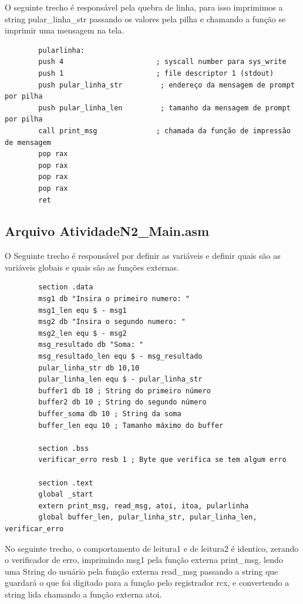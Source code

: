 \documentclass[12pt, openany, oneside, a4paper, brazil]{abntex2}
\begin{document}
	O seguinte trecho é responsável pela quebra de linha, para isso imprimimos a string pular\_linha\_str passando os valores pela pilha e chamando a função se imprimir uma mensagem na tela.
	
	\begin{verbatim}
		pularlinha:
		push 4                      ; syscall number para sys_write
		push 1                      ; file descriptor 1 (stdout)
		push pular_linha_str         ; endereço da mensagem de prompt por pilha
		push pular_linha_len         ; tamanho da mensagem de prompt por pilha
		call print_msg              ; chamada da função de impressão de mensagem
		pop rax
		pop rax
		pop rax
		pop rax
		ret
	\end{verbatim}
	
	\subsection*{Arquivo AtividadeN2\_Main.asm}
	
	O Seguinte trecho é responsável por definir as variáveis e definir quais são as variáveis globais e quais são as funções externas.
	
	\begin{verbatim}
		section .data
		msg1 db "Insira o primeiro numero: "
		msg1_len equ $ - msg1
		msg2 db "Insira o segundo numero: "
		msg2_len equ $ - msg2
		msg_resultado db "Soma: "
		msg_resultado_len equ $ - msg_resultado
		pular_linha_str db 10,10
		pular_linha_len equ $ - pular_linha_str
		buffer1 db 10 ; String do primeiro número
		buffer2 db 10 ; String do segundo número
		buffer_soma db 10 ; String da soma
		buffer_len equ 10 ; Tamanho máximo do buffer
		
		section .bss
		verificar_erro resb 1 ; Byte que verifica se tem algum erro
		
		section .text
		global _start
		extern print_msg, read_msg, atoi, itoa, pularlinha
		global buffer_len, pular_linha_str, pular_linha_len, verificar_erro
	\end{verbatim}
	
	No seguinte trecho, o comportamento de leitura1 e de leitura2 é identico, zerando o verificador de erro, imprimindo msg1 pela função externa print\_msg, lendo uma String do usuário pela função externa read\_msg passando a string que guardará o que foi digitado para a função pelo registrador rcx, e convertendo a string lida chamando a função externa atoi.
	
\end{document}
